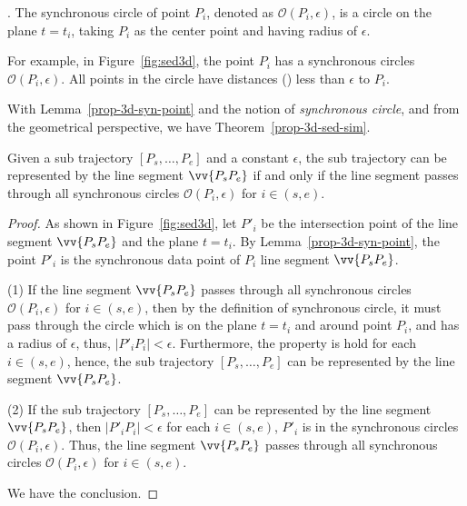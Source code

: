 . The synchronous circle of point $P_i$, denoted as $\mathcal{O}(P_i, \epsilon)$, is a circle on the plane $t=t_i$, taking $P_i$ as the center point and having radius of $\epsilon$. %

For example, in Figure~\ref{fig:sed3d}, the point $P_i$ has a synchronous circles $\mathcal{O}(P_i, \epsilon)$. All points in the circle have distances (\ie \sed) less than $\epsilon$ to $P_i$.

With Lemma~\ref{prop-3d-syn-point} and the notion of \emph{synchronous circle}, and from the geometrical perspective, we have Theorem~\ref{prop-3d-sed-sim}.

\begin{theorem}
\label{prop-3d-sed-sim}
Given a sub trajectory $[P_s, \ldots, P_e]$ and a constant $\epsilon$, the sub trajectory can be represented by the line segment $\vv{P_sP_e}$ if and only if the line segment passes through all synchronous circles $\mathcal{O}(P_i, \epsilon)$ for $i \in (s, e)$.
\end{theorem}

\begin{proof}
As shown in Figure~\ref{fig:sed3d}, let $P'_i$ be the intersection point of the line segment $\vv{P_sP_e}$ and the plane $t=t_i$.
By Lemma~\ref{prop-3d-syn-point}, the point $P'_i$ is the synchronous data point of $P_i$ \wrt line segment $\vv{P_sP_e}$.

(1) If the line segment $\vv{P_sP_e}$ passes through all synchronous circles $\mathcal{O}(P_i, \epsilon)$ for $i \in (s, e)$, then by the definition of synchronous circle, it must pass through the circle which is on the plane $t=t_i$ and around point $P_i$, and has a radius of $\epsilon$, thus, $|P'_iP_i| <\epsilon$. Furthermore, the property is hold for each $i \in (s, e)$, hence, the sub trajectory $[P_s, \ldots, P_e]$ can be represented by the line segment $\vv{P_sP_e}$.

(2) If the sub trajectory $[P_s, \ldots, P_e]$ can be represented by the line segment $\vv{P_sP_e}$, then $|P'_iP_i| <\epsilon$ for each $i \in (s, e)$, \ie $P'_i$ is in the synchronous circles $\mathcal{O}(P_i, \epsilon)$. Thus, the line segment $\vv{P_sP_e}$ passes through all synchronous circles $\mathcal{O}(P_i, \epsilon)$ for $i \in (s, e)$.

We have the conclusion.
\end{proof}


